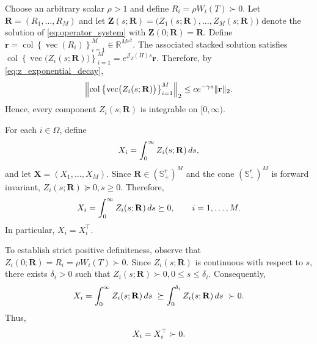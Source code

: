 \documentclass[conference]{IEEEtran}
\begin{document}
\begin{IEEEproof}
		Choose an arbitrary scalar $\rho>1$ and define
		$
		R_i
		=
		\rho W_i(T)
		\succ0.
		$
		Let
		$
		\mathbf R
		=
		(R_1,\ldots,R_M)
		$
		and let
		$
		\mathbf Z(s;\mathbf R)
		=
		\bigl(
		Z_1(s;\mathbf R),
		\ldots,
		Z_M(s;\mathbf R)
		\bigr)
		$
		denote the solution of \eqref{eq:operator_system} with
		$
		\mathbf Z(0;\mathbf R)
		=
		\mathbf R.
		$
		Define
		$
		\mathbf r
		=
		\operatorname{col}
		\left\{
		\operatorname{vec}(R_i)
		\right\}_{i=1}^{M}
		\in\mathbb R^{Mr^2}.
		$
		The associated stacked solution satisfies
		$
		\operatorname{col}
		\left\{
		\operatorname{vec}
		\bigl(
		Z_i(s;\mathbf R)
		\bigr)
		\right\}_{i=1}^{M}
		=
		e^{\mathcal J_T(\Pi)s}\mathbf r.
		$
		Therefore, by \eqref{eq:z_exponential_decay},
		\vspace{-0.2\baselineskip}
		\[
		\left\|
		\operatorname{col}
		\left\{
		\operatorname{vec}
		\bigl(
		Z_i(s;\mathbf R)
		\bigr)
		\right\}_{i=1}^{M}
		\right\|_2
		\leq
		ce^{-\gamma s}
		\|\mathbf r\|_2.	
		\vspace{-0.2\baselineskip}	
		\]
		Hence, every component $Z_i(s;\mathbf R)$ is integrable on
		$[0,\infty)$.
		
		For each $i\in\Omega$, define
		\vspace{-0.2\baselineskip}
		\begin{equation}
			X_i
			=
			\int_0^\infty
			Z_i(s;\mathbf R)\,ds,
			\label{eq:X_integral_construction}	
			\vspace{-0.2\baselineskip}		
		\end{equation}
		and let
		$
		\mathbf X
		=
		(X_1,\ldots,X_M).
		$
		Since
		$
		\mathbf R\in(\mathbb S_+^r)^M
		$
		and the cone $(\mathbb S_+^r)^M$ is forward invariant,
		$
		Z_i(s;\mathbf R)\succeq0,
		s\geq0.
		$
		Therefore,
		\vspace{-0.2\baselineskip}
		\[
		X_i
		=
		\int_0^\infty
		Z_i(s;\mathbf R)\,ds
		\succeq0,
		\qquad
		i=1,\ldots,M.	
		\vspace{-0.2\baselineskip}	
		\]
		In particular, $X_i=X_i^\top$.
		
		To establish strict positive definiteness, observe that
		$
		Z_i(0;\mathbf R)
		=
		R_i
		=
		\rho W_i(T)
		\succ0.
		$
		Since $Z_i(s;\mathbf R)$ is continuous with respect to $s$,
		there exists $\delta_i>0$ such that
		$
		Z_i(s;\mathbf R)\succ0,
		0\leq s\leq\delta_i.
		$
		Consequently,
		\vspace{-0.2\baselineskip}
		\[
		\begin{aligned}
			X_i
			=
			\int_0^\infty
			Z_i(s;\mathbf R)\,ds\
			\succeq
			\int_0^{\delta_i}
			Z_i(s;\mathbf R)\,ds\
			\succ0.
		\end{aligned}	
		\vspace{-0.2\baselineskip}	
		\]
		Thus,
		\vspace{-0.2\baselineskip}
		\[
		X_i=X_i^\top\succ0.		
		\vspace{-0.2\baselineskip}
		\]
		

\end{IEEEproof}
\end{document}
